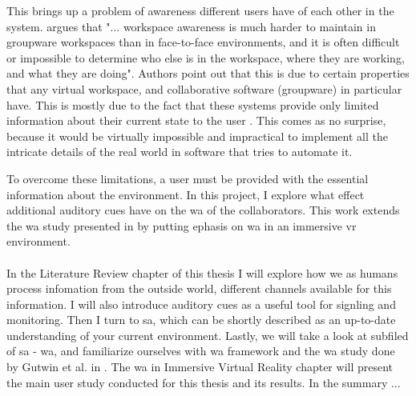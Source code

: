  This brings up a problem of awareness different users have of each other in the system. \cite{gutwin_descriptive_2002} argues that "... workspace awareness is much harder to maintain in groupware workspaces than in face-to-face environments, and it is often difficult or impossible to determine who else is in the workspace, where they are working, and what they are doing". Authors point out that this is due to certain properties that any virtual workspace, and collaborative software (groupware) in particular have. This is mostly due to the fact that these systems provide only limited information about their current state to the user \cite[p.~414-415]{gutwin_descriptive_2002}. This comes as no surprise, because it would be virtually impossible and impractical to implement all the intricate details of the real world in software that tries to automate it. 
  

 To overcome these limitations, a user must be provided with the essential information about the environment. In this project, I explore what effect additional auditory cues have on the \gls{wa} of the collaborators. This work extends the \gls{wa} study presented in \cite{gutwin_chalk_2011} by putting ephasis on \gls{wa} in an immersive \gls{vr} environment.
 

\paragraph{}
In the Literature Review chapter of this thesis I will explore how we as humans process infomation from the outside world, different channels available for this information. I will also introduce auditory cues as a useful tool for signling and monitoring. Then I turn to \gls{sa}, which can be shortly described as an up-to-date understanding of your current environment. Lastly, we will take a look at subfiled of \gls{sa} - \gls{wa}, and familiarize ourselves with \gls{wa} framework and the \gls{wa} study done by Gutwin et al. in \cite{gutwin_chalk_2011}. The \gls{wa} in Immersive Virtual Reality chapter will present the main user study conducted for this thesis and its results. In the summary ...


